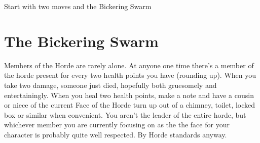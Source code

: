 \documentclass{tufte-book}
\begin{document}

Start with two moves and the Bickering Swarm

\section{The Bickering Swarm}
Members of the Horde are rarely alone. At anyone one time there's a member of the horde present for every two health points you have (rounding up). When you take two damage, someone just died, hopefully both gruesomely and entertainingly. When you heal two health points, make a note and have a cousin or niece of the current Face of the Horde turn up out of a chimney, toilet, locked box or similar when convenient. You aren't the leader of the entire horde, but whichever member you are currently focusing on as the the face for your character is probably quite well respected. By Horde standards anyway.
\end{document}

